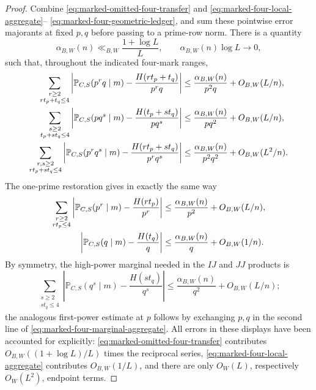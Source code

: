 \documentclass[11pt]{article}
\numberwithin{equation}{section}
\theoremstyle{definition}
\theoremstyle{remark}
\newcommand{\1}{\mathbf 1}
\begin{document}
\begin{proof}
Combine \eqref{eq:marked-omitted-four-transfer} and
\eqref{eq:marked-four-local-aggregate}--
\eqref{eq:marked-four-geometric-ledger}, and sum these pointwise error
majorants at fixed \(p,q\) before passing to a prime-row norm.  There is
a quantity
\begin{equation}
 \alpha_{B,W}(n)\ll_{B,W}\frac{1+\log L}{L},
 \qquad \alpha_{B,W}(n)\log L\longrightarrow0,
 \label{eq:marked-four-pair-error-rate}
\end{equation}
such that, throughout the indicated four-mark ranges,
\begin{align}
 \sum_{\substack{r\ge2\\rt_p+t_q\le4}}
 \left|\mathbb P_{C,S}(p^rq\mid m)
       -\frac{H(rt_p+t_q)}{p^rq}\right|
 &\le\frac{\alpha_{B,W}(n)}{p^2q}+O_{B,W}(L/n),\notag\\
 \sum_{\substack{s\ge2\\t_p+st_q\le4}}
 \left|\mathbb P_{C,S}(pq^s\mid m)
       -\frac{H(t_p+st_q)}{pq^s}\right|
 &\le\frac{\alpha_{B,W}(n)}{pq^2}+O_{B,W}(L/n),\notag\\
 \sum_{\substack{r,s\ge2\\rt_p+st_q\le4}}
 \left|\mathbb P_{C,S}(p^rq^s\mid m)
       -\frac{H(rt_p+st_q)}{p^rq^s}\right|
 &\le\frac{\alpha_{B,W}(n)}{p^2q^2}+O_{B,W}(L^2/n).
 \label{eq:marked-four-joint-aggregate}
\end{align}
The one-prime restoration gives in exactly the same way
\begin{align}
 \sum_{\substack{r\ge2\\rt_p\le4}}
 \left|\mathbb P_{C,S}(p^r\mid m)-\frac{H(rt_p)}{p^r}\right|
 &\le\frac{\alpha_{B,W}(n)}{p^2}+O_{B,W}(L/n),\notag\\
 \left|\mathbb P_{C,S}(q\mid m)-\frac{H(t_q)}q\right|
 &\le\frac{\alpha_{B,W}(n)}q+O_{B,W}(1/n).
 \label{eq:marked-four-marginal-aggregate}
\end{align}
By symmetry, the high-power marginal needed in the \(IJ\) and \(JJ\)
products is
\begin{equation}
 \sum_{\substack{s\ge2\\st_q\le4}}
 \left|\mathbb P_{C,S}(q^s\mid m)-\frac{H(st_q)}{q^s}\right|
 \le\frac{\alpha_{B,W}(n)}{q^2}+O_{B,W}(L/n);
 \label{eq:marked-four-symmetric-marginal-aggregate}
\end{equation}
the analogous first-power estimate at \(p\) follows by exchanging
\(p,q\) in the second line of
\eqref{eq:marked-four-marginal-aggregate}.
All errors in these displays have been accounted for explicitly:
\eqref{eq:marked-omitted-four-transfer} contributes
\(O_{B,W}((1+\log L)/L)\) times the reciprocal series,
\eqref{eq:marked-four-local-aggregate} contributes \(O_{B,W}(1/L)\),
and there are only \(O_W(L)\), respectively \(O_W(L^2)\), endpoint
terms.


\end{proof}
\end{document}
